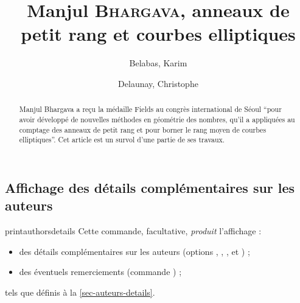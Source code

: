 \begin{bodycode}
\title[short=Les travaux de Manjul \textsc{Bhargava}]{Manjul \textsc{Bhargava},
  anneaux de petit rang et courbes elliptiques}
%
\author[%
affiliation={%
  Univ. Bordeaux, IMB, UMR 5251, F-33400 Talence, France\newline CNRS, IMB, UMR
  5251, F-33400 Talence, France\newline INRIA, F-33400 Talence, France%
},%
photo=Belabas,%
email=Karim.Belabas@math.u-bordeaux.fr,%
minibio={%
  Karim Belabas est professeur à l'université de Bordeaux.  Ses centres
  d'intérêts sont la théorie des nombres sous toutes ses formes et le calcul
  formel.  Il développe le système libre PARI/GP.%
}%
]{Belabas, Karim}
%
\author[%
affiliation={%
  Laboratoire de Mathématiques de Besançon, Facultés des sciences et techniques,
  CNRS, UMR 6623, 16 route de Gray, 25030 Besançon, France%
},%
photo=Delaunay,%
email=Christophe.Delaunay@univ-fcomte.fr,%
minibio={%
  Christophe Delaunay est professeur à l'université de Franche-Comté et membre
  du laboratoire de mathématiques de Besançon. Il est spécialiste de théorie des
  nombres.%
}%
]{Delaunay, Christophe}
%
\begin{abstract}
  Manjul Bhargava a reçu la médaille Fields au congrès international de Séoul
  \enquote{pour avoir développé de nouvelles méthodes en géométrie des nombres,
    qu'il a appliquées au comptage des anneaux de petit rang et pour borner le
    rang moyen de courbes elliptiques}. Cet article est un survol d'une partie
  de ses travaux.
\end{abstract}
%
\maketitle
\end{bodycode}

\subsection{Affichage des détails complémentaires sur les auteurs}

\begin{docCommand}{printauthorsdetails}{}
  Cette commande, facultative, \emph{produit} l'affichage :
  \begin{itemize}
  \item des détails complémentaires sur les auteurs (options
    , , ,  et
    ) ;
  \item des éventuels remerciements (commande ) ;
  \end{itemize}
  tels que définis à la \vref{sec-auteurs-details}.
\end{docCommand}

